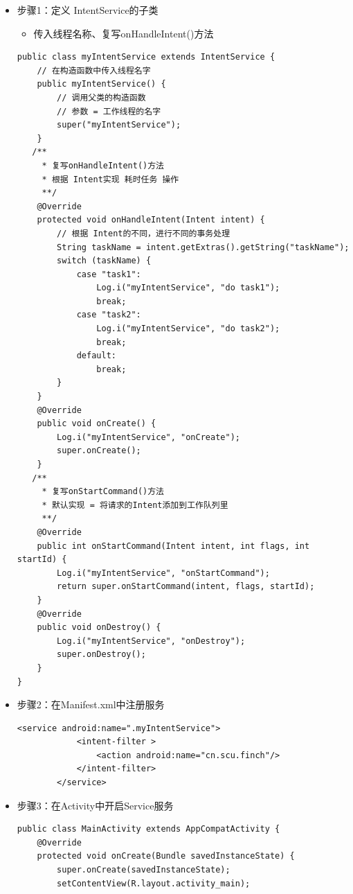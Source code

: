 \documentclass[9pt, b5paper]{article}
\begin{document}
\begin{itemize}
\item 步骤1：定义 IntentService的子类
\begin{itemize}
\item 传入线程名称、复写onHandleIntent()方法
\end{itemize}
\begin{verbatim}
public class myIntentService extends IntentService {
    // 在构造函数中传入线程名字
    public myIntentService() {
        // 调用父类的构造函数
        // 参数 = 工作线程的名字
        super("myIntentService");
    }
   /** 
     * 复写onHandleIntent()方法
     * 根据 Intent实现 耗时任务 操作
     **/  
    @Override
    protected void onHandleIntent(Intent intent) {
        // 根据 Intent的不同，进行不同的事务处理
        String taskName = intent.getExtras().getString("taskName");
        switch (taskName) {
            case "task1":
                Log.i("myIntentService", "do task1");
                break;
            case "task2":
                Log.i("myIntentService", "do task2");
                break;
            default:
                break;
        }
    }
    @Override
    public void onCreate() {
        Log.i("myIntentService", "onCreate");
        super.onCreate();
    }
   /** 
     * 复写onStartCommand()方法
     * 默认实现 = 将请求的Intent添加到工作队列里
     **/  
    @Override
    public int onStartCommand(Intent intent, int flags, int startId) {
        Log.i("myIntentService", "onStartCommand");
        return super.onStartCommand(intent, flags, startId);
    }
    @Override
    public void onDestroy() {
        Log.i("myIntentService", "onDestroy");
        super.onDestroy();
    }
}
\end{verbatim}
\item 步骤2：在Manifest.xml中注册服务
\begin{verbatim}
<service android:name=".myIntentService">
            <intent-filter >
                <action android:name="cn.scu.finch"/>
            </intent-filter>
        </service>
\end{verbatim}
\item 步骤3：在Activity中开启Service服务
\begin{verbatim}
public class MainActivity extends AppCompatActivity {
    @Override
    protected void onCreate(Bundle savedInstanceState) {
        super.onCreate(savedInstanceState);
        setContentView(R.layout.activity_main);

\end{verbatim}
\end{itemize}
\end{document}
